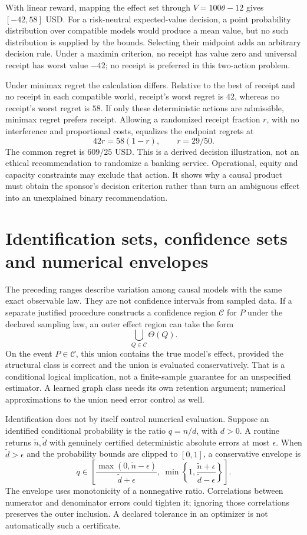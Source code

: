With linear reward, mapping the effect set through
$V=100\theta-12$ gives $[-42,58]$ USD.
For a risk-neutral expected-value decision, a point
probability distribution over compatible models would
produce a mean value, but no such distribution is supplied
by the bounds. Selecting their midpoint adds an arbitrary
decision rule. Under a maximin criterion, no receipt has
value zero and universal receipt has worst value $-42$;
no receipt is preferred in this two-action problem.

Under minimax regret the calculation differs. Relative
to the best of receipt and no receipt in each compatible
world, receipt's worst regret is $42$, whereas no receipt's
worst regret is $58$. If only these deterministic actions
are admissible, minimax regret prefers receipt. Allowing a
randomized receipt fraction $r$, with no interference and
proportional costs, equalizes the endpoint regrets at
\[
 42r=58(1-r),\qquad r=29/50.
\]
The common regret is $609/25$ USD. This is a derived
decision illustration, not an ethical recommendation to
randomize a banking service. Operational, equity and
capacity constraints may exclude that action. It shows
why a causal product must obtain the sponsor's decision
criterion rather than turn an ambiguous effect into an
unexplained binary recommendation.~\citep{exec17_s3_decision}

\section{Identification sets, confidence sets and numerical envelopes}
\label{exec17:s3-numerical}

The preceding ranges describe variation among causal models
with the same exact observable law. They are not confidence
intervals from sampled data. If a separate justified
procedure constructs a confidence region $\mathcal C$
for $P$ under the declared sampling law, an outer effect
region can take the form
\[
 \bigcup_{Q\in\mathcal C}\Theta(Q).
\]
On the event $P\in\mathcal C$, this union contains the true
model's effect, provided the structural class is correct
and the union is evaluated conservatively. That is a
conditional logical implication, not a finite-sample
guarantee for an unspecified estimator. A learned graph
class needs its own retention argument; numerical
approximations to the union need error control as well.

Identification does not by itself control numerical
evaluation. Suppose an identified conditional probability
is the ratio $q=n/d$, with $d>0$. A routine returns
$\widetilde n,\widetilde d$ with genuinely certified
deterministic absolute errors at most $\epsilon$. When
$\widetilde d>\epsilon$ and the probability bounds are
clipped to $[0,1]$, a conservative envelope is
\[
 q\in\left[
 \frac{\max(0,\widetilde n-\epsilon)}{\widetilde d+\epsilon},
 \ \min\left\{1,
 \frac{\widetilde n+\epsilon}{\widetilde d-\epsilon}\right\}
 \right].
\]
The envelope uses monotonicity of a nonnegative ratio.
Correlations between numerator and denominator errors
could tighten it; ignoring those correlations preserves
the outer inclusion. A declared tolerance in an optimizer
is not automatically such a certificate.


